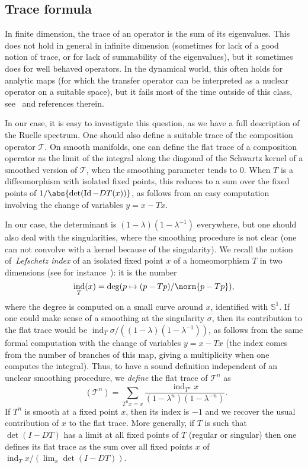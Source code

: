 \documentclass[11pt, a4paper, oneside, final, pagebackref]{amsart}
\newcommand{\boT}{\mathcal{T}}
\newcommand{\Sbb}{\mathbb{S}}
\DeclareMathOperator{\ind}{ind}
\DeclareMathOperator{\Id}{Id}
\DeclareMathOperator{\flattr}{\mathrm{tr}^{\flat}}
\theoremstyle{definition}
\numberwithin{equation}{section}
\begin{document}
\subsection*{Trace formula}

In finite dimension, the trace of an operator is the sum of its eigenvalues.
This does not hold in general in infinite dimension (sometimes for lack of a
good notion of trace, or for lack of summability of the eigenvalues), but it
sometimes does for well behaved operators. In the dynamical world, this often
holds for analytic maps (for which the transfer operator can be interpreted
as a nuclear operator on a suitable space), but it fails most of the time
outside of this class, see~\cite{jezequel} and references therein.

In our case, it is easy to investigate this question, as we have a full
description of the Ruelle spectrum. One should also define a suitable trace
of the composition operator $\boT$. On smooth manifolds, one can define the
flat trace of a composition operator as the limit of the integral along the
diagonal of the Schwartz kernel of a smoothed version of $\boT$, when the
smoothing parameter tends to $0$. When $T$ is a diffeomorphism with isolated
fixed points, this reduces to a sum over the fixed points of
$1/{\abs{\det(\Id - DT(x))}}$, as follows from an easy computation involving
the change of variables $y = x - T x$.

In our case, the determinant is $(1-\lambda) (1-\lambda^{-1})$ everywhere,
but one should also deal with the singularities, where the smoothing
procedure is not clear (one can not convolve with a kernel because of the
singularity). We recall the notion of~\emph{Lefschetz index} of an isolated
fixed point $x$ of a homeomorphism $T$ in two dimensions (see for
instance~\cite[Section 8.4]{katok}): it is the number
\begin{equation*}
  \ind_T (x) = \deg (p \mapsto (p-T p)/\norm{p-T p}),
\end{equation*}
where the degree is computed on a small curve around $x$, identified with
$\Sbb^1$. If one could make sense of a smoothing at the singularity $\sigma$,
then its contribution to the flat trace would be $\ind_T \sigma/((1-\lambda)
(1-\lambda^{-1}))$, as follows from the same formal computation with the
change of variables $y = x- Tx$ (the index comes from the number of branches
of this map, giving a multiplicity when one computes the integral). Thus, to
have a sound definition independent of an unclear smoothing procedure, we
\emph{define} the flat trace of $\boT^n$ as
\begin{equation*}
  \flattr(\boT^n) = \sum_{T^n x = x} \frac{ \ind_{T^n} x}{(1-\lambda^n) (1-\lambda^{-n})}.
\end{equation*}
If $T^n$ is smooth at a fixed point $x$, then its index is $-1$ and we
recover the usual contribution of $x$ to the flat trace. More generally, if
$T$ is such that $\det(I-DT)$ has a limit at all fixed points of $T$ (regular
or singular) then one defines its flat trace as the sum over all fixed points
$x$ of $\ind_T x/(\lim_x \det(I-DT))$.
\end{document}
